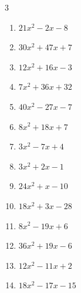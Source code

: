 \begin{multicols}{3}
\begin{enumerate}
\resetques

  \item $21x^{2}-2x-8$

        \phantom{$=(7x+4)(3x-2)$}

  \item $30x^{2}+47x+7$

        \phantom{$=(6x+1)(5x+7)$}

  \item $12x^{2}+16x-3$

        \phantom{$=(6x-1)(2x+3)$}

  \item $7x^{2}+36x+32$

        \phantom{$=(x+4)(7x+8)$}

  \item $40x^{2}-27x-7$

        \phantom{$=(8x-7)(5x+1)$}

  \item $8x^{2}+18x+7$

        \phantom{$=(2x+1)(4x+7)$}

  \item $3x^{2}-7x+4$

        \phantom{$=(3x-4)(x-1)$}

  \item $3x^{2}+2x-1$

        \phantom{$=(3x-1)(x+1)$}

  \item $24x^{2}+x-10$

        \phantom{$=(8x-5)(3x+2)$}

  \item $18x^{2}+3x-28$

        \phantom{$=(3x+4)(6x-7)$}

\columnbreak %

  \item $8x^{2}-19x+6$

        \phantom{$=(8x-3)(x-2)$}

  \item $36x^{2}+19x-6$

        \phantom{$=(4x+3)(9x-2)$}

  \item $12x^{2}-11x+2$

        \phantom{$=(4x-1)(3x-2)$}

  \item $18x^{2}-17x-15$

        \phantom{$=(2x-3)(9x+5)$}


\end{enumerate}
\end{multicols}
